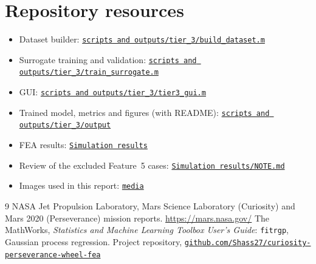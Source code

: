\documentclass[11pt,a4paper]{article}
\newcommand{\repo}{https://github.com/Shass27/curiosity-perseverance-wheel-fea}
\newcommand{\tree}{\repo/tree/main}
\newcommand{\blob}{\repo/blob/main}
\begin{document}
\section*{Repository resources}
\begin{itemize}\setlength\itemsep{0pt}
  \item Dataset builder: \href{\blob/scripts\%20and\%20outputs/tier_3/build_dataset.m}{\texttt{scripts and outputs/tier\_3/build\_dataset.m}}
  \item Surrogate training and validation: \href{\blob/scripts\%20and\%20outputs/tier_3/train_surrogate.m}{\texttt{scripts and outputs/tier\_3/train\_surrogate.m}}
  \item GUI: \href{\blob/scripts\%20and\%20outputs/tier_3/tier3_gui.m}{\texttt{scripts and outputs/tier\_3/tier3\_gui.m}}
  \item Trained model, metrics and figures (with README): \href{\tree/scripts\%20and\%20outputs/tier_3/output}{\texttt{scripts and outputs/tier\_3/output}}
  \item FEA results: \href{\tree/Simulation\%20results}{\texttt{Simulation results}}
  \item Review of the excluded Feature~5 cases: \href{\blob/Simulation\%20results/NOTE.md}{\texttt{Simulation results/NOTE.md}}
  \item Images used in this report: \href{\tree/media}{\texttt{media}}
\end{itemize}

\begin{thebibliography}{9}
   NASA Jet Propulsion Laboratory, Mars Science Laboratory (Curiosity) and Mars 2020 (Perseverance) mission reports. \url{https://mars.nasa.gov/}
   The MathWorks, \emph{Statistics and Machine Learning Toolbox User's Guide}: \texttt{fitrgp}, Gaussian process regression.
   Project repository, \href{\repo}{\texttt{github.com/Shass27/curiosity-perseverance-wheel-fea}}
\end{thebibliography}
\end{document}
